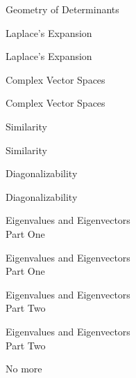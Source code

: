\documentclass{titlescreen}
\begin{document}
\begin{videotitle}
  Geometry of Determinants 
\end{videotitle}
\begin{videoend}
  Laplace's Expansion
\end{videoend}


\begin{videotitle}
  Laplace's Expansion
\end{videotitle}
\begin{videoend}
  Complex Vector Spaces
\end{videoend}




\begin{videotitle}
  Complex Vector Spaces  
\end{videotitle}
\begin{videoend}
  Similarity
\end{videoend}

\begin{videotitle}
  Similarity 
\end{videotitle}
\begin{videoend}
  Diagonalizability 
\end{videoend}

\begin{videotitle}
  Diagonalizability
\end{videotitle}
\begin{videoend}
  Eigenvalues and Eigenvectors \\[1ex]
  Part One
\end{videoend}

\begin{videotitle}
  Eigenvalues and Eigenvectors \\[1ex]
  Part One
\end{videotitle}
\begin{videoend}
  Eigenvalues and Eigenvectors \\[1ex]
  Part Two
\end{videoend}

\begin{videotitle}
  Eigenvalues and Eigenvectors \\[1ex]
  Part Two
\end{videotitle}
\begin{videoend}
  No more
\end{videoend}
\end{document}
